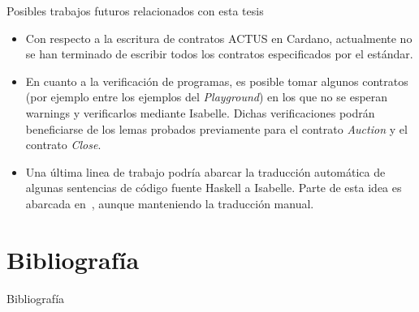 \documentclass{beamer}
\begin{document}
\begin{frame}{Posibles trabajos futuros relacionados con esta tesis}
    \begin{itemize}
        \item Con respecto a la escritura de contratos ACTUS en Cardano, actualmente no se han terminado de escribir todos los contratos especificados por el estándar.
            \pause

        \item En cuanto a la verificación de programas, es posible tomar algunos contratos (por ejemplo entre los ejemplos del \textit{Playground}) en los que no se esperan warnings y verificarlos mediante Isabelle. Dichas verificaciones podrán beneficiarse de los lemas probados previamente para el contrato \textit{Auction} y el contrato \textit{Close}.
            \pause

        \item Una última linea de trabajo podría abarcar la traducción automática de algunas sentencias de código fuente Haskell a Isabelle. Parte de esta idea es abarcada en~\cite{translating-haskell-to-isabelle}, aunque manteniendo la traducción manual.
    \end{itemize}
\end{frame}


\section{Bibliografía}
\begin{frame}[allowframebreaks]{Bibliografía}
    
    
\end{frame}
\end{document}
